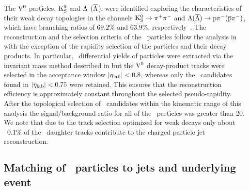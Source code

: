 The ${\rm V}^{0}$ particles, $\rm{K}^{0}_{\rm S}$ and $\Lambda$ ($\overline{\Lambda}$), were identified exploring the characteristics of their weak decay topologies in the channels $\rm{K}^{0}_{\rm S}\to\pi^{+}\pi^{-}$ and $\Lambda(\overline{\Lambda})\to{\rm p}\pi^{-}(\overline{\rm p}\pi^{-})$, which have branching ratios of $69.2\%$ and $63.9\%$, respectively~\cite{Agashe:2014kda}.
The reconstruction and the selection criteria of the \Vzero\ particles follow the analysis in \cite{Abelev:2013haa} with the exception of the rapidity selection of the particles and their decay products.
In particular, \pt\ differential yields of \Vzero particles were extracted via the invariant mass method described in \cite{Abelev:2013haa} but the ${\rm V}^{0}$ decay-product tracks were selected in the acceptance window $\left|\eta_{\rm lab}\right|<0.8$, whereas only the \Vzero\ candidates found in $\left|\eta_{\rm lab}\right|<0.75$ were retained. 
This ensures that the reconstruction efficiency is approximately constant throughout the selected pseudo-rapidity. 
After the topological selection of \Vzero\ candidates within the kinematic range of this analysis the signal/background ratio for all of the \Vzero\ particles was greater than 20. 
We note that due to the track selection optimized for weak decays only about ~0.1\% of the \Vzero\ daughter tracks contribute to the charged particle jet reconstruction. 



\subsection{Matching of \Vzero\ particles to jets and underlying event}
\label{sec:c05V0JetMat}

